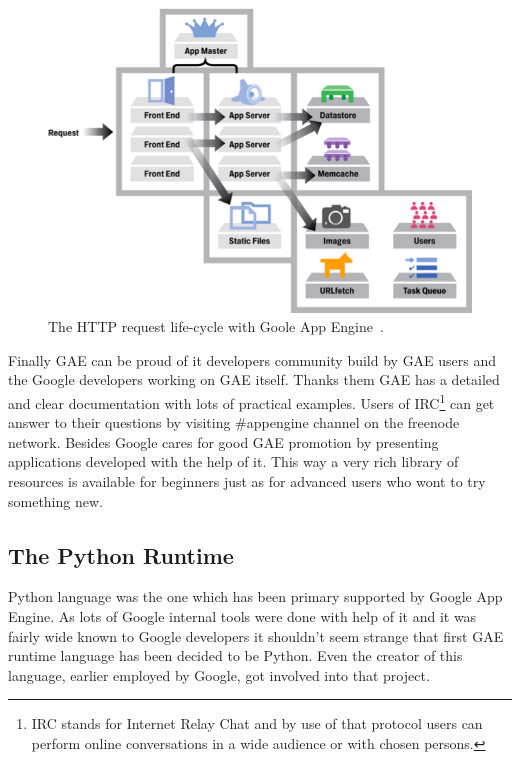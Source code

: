 \begin{figure}[h]
\begin{center}
\includegraphics[scale=0.4]{img/gae_request.png}
\caption{The HTTP request life-cycle with Goole App Engine~\cite{gae_request_cycle}.}
\label{fig:gae_request_cycle}
\end{center}
\end{figure}
 
Finally GAE can be proud of it developers community build by GAE users and the Google developers working on GAE itself. Thanks them GAE has a detailed and clear documentation with lots of practical examples. Users of IRC\footnote{IRC stands for Internet Relay Chat and by use of that protocol users can perform online conversations in a wide audience or with chosen persons.} can get answer to their questions by visiting \#appengine channel on the freenode network. Besides Google cares for good GAE promotion by presenting applications developed with the help of it. This way a very rich library of resources is available for beginners just as for advanced users who wont to try something new. 
  
  
\subsection{The Python Runtime}\label{subsec:gae_py}
Python language was the one which has been primary supported by Google App Engine. As lots of Google internal tools were done with help of it and it was fairly wide known to Google developers it shouldn't seem strange that first GAE runtime language has been decided to be Python. Even the creator of this language, earlier employed by Google, got involved into that project.

